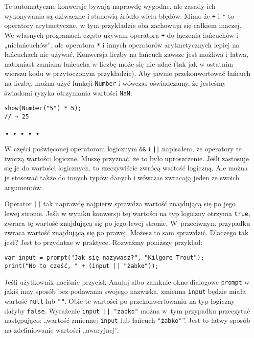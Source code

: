     
Te automatyczne konwersje bywają naprawdę wygodne, ale zasady ich wykonywania są dziwaczne i stanowią źródło wielu błędów. Mimo że \texttt{+} i \texttt{*} to operatory arytmetyczne, w tym przykładzie oba zachowują się całkiem inaczej. We własnych programach często używam operatora \texttt{+} do łączenia łańcuchów i „niełańcuchów”, ale operatora \texttt{*} i innych operatorów arytmetycznych lepiej na łańcuchach nie używać. Konwersja liczby na łańcuch zawsze jest możliwa i łatwa, natomiast zamiana łańcucha w liczbę może się nie udać (tak jak w ostatnim wierszu kodu w przytoczonym przykładzie). Aby jawnie przekonwertować łańcuch na liczbę, można użyć funkcji \texttt{Number} i wówczas oświadczamy, że jesteśmy świadomi ryzyka otrzymania wartości \texttt{NaN}.

\begin{verbatim} 
show(Number("5") * 5);
// → 25
\end{verbatim}
  
\begin{center}
• • • • •
\end{center}
  
    
W części poświęconej operatorom logicznym \texttt{\&\&} i \texttt{||}\index{||} napisałem, że operatory te tworzą wartości logiczne. Muszę przyznać, że to było uproszczenie. Jeśli zastosuje się je do wartości logicznych, to rzeczywiście zwrócą wartość logiczną. Ale można je stosować także do innych typów danych i wówczas zwracają jeden ze swoich argumentów.

    
Operator \texttt{||} tak naprawdę najpierw sprawdza wartość znajdującą się po jego lewej stronie. Jeśli w wyniku konwersji tej wartości na typ logiczny otrzyma \texttt{true}, zwraca tę wartość znajdującą się po jego lewej stronie. W~przeciwnym przypadku zwraca wartość znajdującą się po prawej. Możesz to sam sprawdzić. Dlaczego tak jest? Jest to przydatne w praktyce. Rozważmy poniższy przykład:

\begin{verbatim} 
var input = prompt("Jak się nazywasz?", "Kilgore Trout");
print("No to cześć, " + (input || "żabko"));
\end{verbatim}
    
Jeśli użytkownik naciśnie przycisk Anuluj albo zamknie okno dialogowe \texttt{prompt} w jakiś inny sposób bez podawania swojego nazwiska, zmienna \texttt{input} będzie miała wartość \texttt{null} lub \texttt{""}. Obie te wartości po przekonwertowaniu na typ logiczny dałyby \texttt{false}. Wyrażenie \texttt{input || "żabko"} można w~tym przypadku przeczytać następująco: „wartość zmiennej \texttt{input} lub łańcuch \texttt{"żabko"}”. Jest to łatwy sposób na zdefiniowanie wartości „awaryjnej”.

